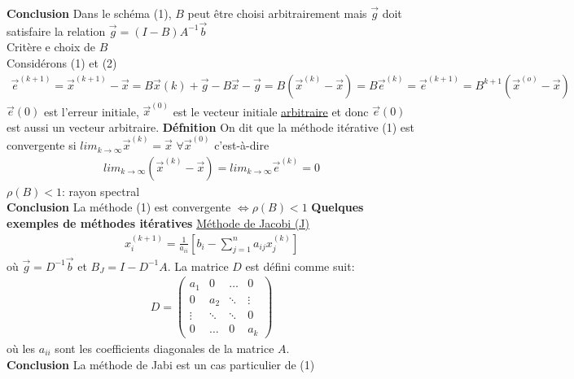 \textbf{Conclusion}
Dans le schéma (1), $B$ peut être choisi arbitrairement mais $\overrightarrow g$ doit satisfaire la relation $\overrightarrow g=(I-B)A^{-1}\overrightarrow b$
\\Critère e choix de $B$
\\Considérons (1) et (2)
\begin{eqnarray}
	\overrightarrow e^{(k+1)}=\overrightarrow{x}^{(k+1)}-\overrightarrow x=B\overrightarrow x{(k)}+\overrightarrow g-B\overrightarrow x - \overrightarrow g=B(\overrightarrow x^{(k)}-\overrightarrow x)=B\overrightarrow e^{(k)}=\overrightarrow e^{(k+1)}=B^{k+1}(\overrightarrow x^{(o)}-\overrightarrow x)
\end{eqnarray}
$\overrightarrow e{(0)}$ est l'erreur initiale, $\overrightarrow x^{(0)}$ est le vecteur initiale \underline{arbitraire} et donc $\overrightarrow e{(0)}$ est aussi un vecteur arbitraire.
\textbf{Défnition} On dit que la méthode itérative (1) est convergente si $lim_{k\rightarrow\infty}\overrightarrow x^{(k)}=\overrightarrow x$ $\forall\overrightarrow x^{(0)}$ c'est-à-dire
\begin{eqnarray*}
	lim_{k\rightarrow\infty}(\overrightarrow x^{(k)}-\overrightarrow x)=lim_{k\rightarrow\infty}\overrightarrow e^{(k)}=0
\end{eqnarray*}
$\rho(B)< 1$: rayon spectral
\\
\textbf{Conclusion} La méthode (1) est convergente $\Leftrightarrow \rho(B)< 1$
\textbf{Quelques exemples de méthodes itératives}
\underline{Méthode de Jacobi (J)}
\begin{eqnarray}
	x_i^{(k+1)}=\frac{1}{a_{ii}}\left[b_i-\sum_{j=1}^{n}a_{ij}x_{j}^{(k)}\right]
\end{eqnarray}
où $\overrightarrow g=D^{-1}\overrightarrow b$ et $B_J=I-D^{-1}A$. La matrice $D$ est défini comme suit:
\begin{eqnarray*}
	D=\begin{pmatrix} a_1    & 0      & \ldots & 0      \\ 0      & a_2    & \ddots & \vdots \\ \vdots & \ddots & \ddots & 0      \\ 0      & \ldots & 0      & a_k \end{pmatrix}
\end{eqnarray*}
où les $a_{ii}$ sont les coefficients diagonales de la matrice $A$.
\\
\textbf{Conclusion} La méthode de Jabi est un cas particulier de (1)
\\\\
